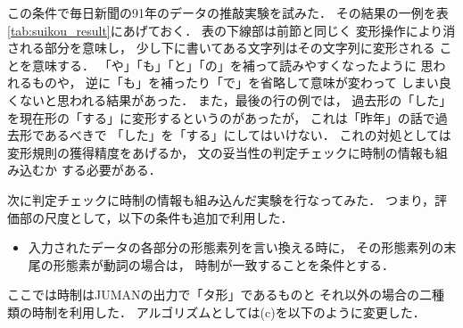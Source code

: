 この条件で毎日新聞の91年のデータの推敲実験を試みた．
その結果の一例を表\ref{tab:suikou_result}にあげておく．
表の下線部は前節と同じく
変形操作により消される部分を意味し，
少し下に書いてある文字列はその文字列に変形される
ことを意味する．
「や」「も」「と」「の」を補って読みやすくなったように
思われるものや，
逆に「も」を補ったり「で」を省略して意味が変わって
しまい良くないと思われる結果があった．
また，最後の行の例では，
過去形の「した」を現在形の「する」に変形するというのがあったが，
これは「昨年」の話で過去形であるべきで
「した」を「する」にしてはいけない．
これの対処としては変形規則の獲得精度をあげるか，
文の妥当性の判定チェックに時制の情報も組み込むか
する必要がある．

次に判定チェックに時制の情報も組み込んだ実験を行なってみた．
つまり，評価部の尺度として，以下の条件も追加で利用した．
\begin{itemize}
\item 
  入力されたデータの各部分の形態素列を言い換える時に，
  その形態素列の末尾の形態素が動詞の場合は，
  時制が一致することを条件とする．
\end{itemize}
ここでは時制はJUMANの出力で「タ形」であるものと
それ以外の場合の二種類の時制を利用した．
アルゴリズムとしては(c)を以下のように変更した．
